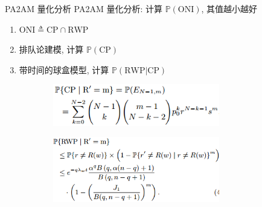 \begin{frame}{PA2AM 量化分析}
  PA2AM 量化分析: 计算 $\mathbb{P}(\textrm{ONI})$, 其值越小越好

  \begin{enumerate}
	\setlength{\itemsep}{3pt}
	\item $\textrm{ONI} \triangleq \textrm{CP}  \cap \textrm{RWP}$
	\item 排队论建模, 计算 $\mathbb{P}(\textrm{CP})$ 
	\item 带时间的球盒模型, 计算 $\mathbb{P}(\textrm{RWP|CP})$
  \end{enumerate}

  \begin{figure}
	\begin{subfigure}{0.50\textwidth}
	  \centering
	  \includegraphics[width = 0.80\textwidth]{figures/cp.png}
	\end{subfigure}%
	\begin{subfigure}{0.50\textwidth}
	  \centering
	  \includegraphics[width = 0.80\textwidth]{figures/rwp.png}
	\end{subfigure}
  \end{figure}
\end{frame}
